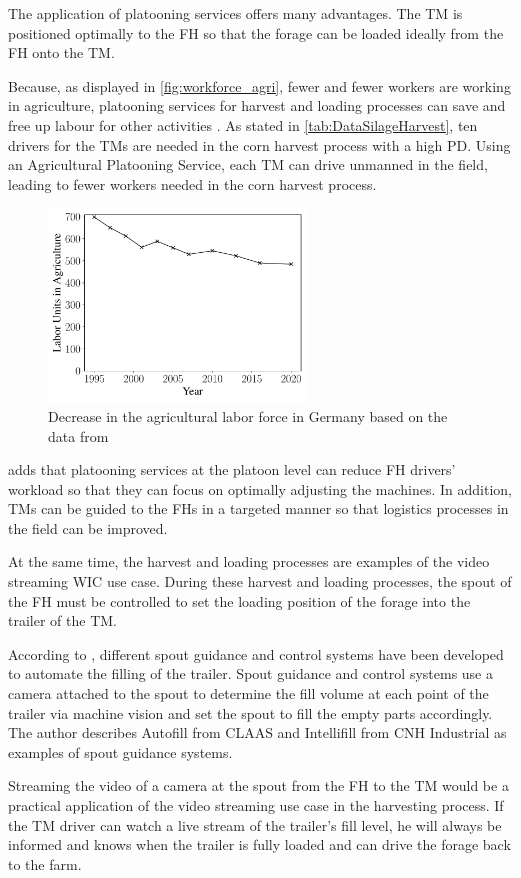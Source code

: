 The application of platooning services offers many advantages.
The \ac{TM} is positioned optimally to the \ac{FH} so that the forage can be loaded ideally from the \ac{FH} onto the \ac{TM}.

Because, as displayed in \autoref{fig:workforce_agri}, fewer and fewer workers are working in agriculture, platooning services for harvest and loading processes can save and free up labour for other activities \cite{liu_automation_2022}. As stated in \autoref{tab:DataSilageHarvest}, ten drivers for the \acp{TM} are needed in the corn harvest process with a high \ac{PD}. Using an Agricultural Platooning Service, each \ac{TM} can drive unmanned in the field, leading to fewer workers needed in the corn harvest process.

\begin{figure}[H]
   \centering
   \includegraphics[width=0.61\textwidth]{figures/WorkForceAgriculture.pdf}
   \caption{Decrease in the agricultural labor force in Germany based on the data from \cite{bmel2020}}%
   \label{fig:workforce_agri}%
\end{figure}

\textcite{smolnik_5g_2020} adds that platooning services at the platoon level can reduce \ac{FH} drivers' workload so that they can focus on optimally adjusting the machines.
In addition, \acp{TM} can be guided to the \acp{FH} in a targeted manner so that logistics processes in the field can be improved.

At the same time, the harvest and loading processes are examples of the video streaming \ac{WIC} use case.
During these harvest and loading processes, the spout of the \ac{FH} must be controlled to set the loading position of the forage into the trailer of the \ac{TM}.

According to \textcite{murcia_quadrotor_2014}, different spout guidance and control systems have been developed
to automate the filling of the trailer.
Spout guidance and control systems use a camera attached to the spout to determine the fill volume at each point of the
trailer via machine vision and set the spout to fill the empty parts accordingly.
The author describes Autofill from CLAAS and Intellifill from CNH Industrial as examples of
spout guidance systems.

Streaming the video of a camera at the spout from the \ac{FH} to the \ac{TM} would be a practical application of the video streaming use case in the harvesting process. If the \ac{TM} driver can watch a live stream of the trailer's fill level, he will always be
informed and knows when the trailer is fully loaded and can drive the forage back to the
farm.

